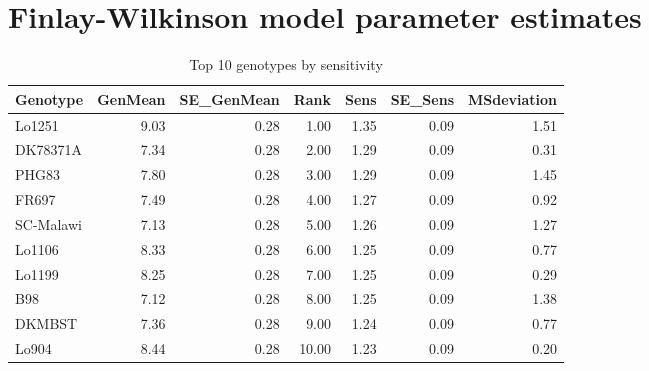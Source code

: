 \documentclass[a4paper,11pt]{article}\usepackage[]{graphicx}\usepackage[]{xcolor}
\makeatletter
\newenvironment{kframe}{%
 \def\at@end@of@kframe{}%
 \ifinner\ifhmode%
  \def\at@end@of@kframe{\end{minipage}}%
  \begin{minipage}{\columnwidth}%
 \fi\fi%
 \def\FrameCommand##1{\hskip\@totalleftmargin \hskip-\fboxsep
 \colorbox{shadecolor}{##1}\hskip-\fboxsep
     \hskip-\linewidth \hskip-\@totalleftmargin \hskip\columnwidth}%
 \MakeFramed {\advance\hsize-\width
   \@totalleftmargin\z@ \linewidth\hsize
   \@setminipage}}%
 {\par\unskip\endMakeFramed%
 \at@end@of@kframe}
\makeatother
\begin{document}
\section{Finlay-Wilkinson model parameter estimates}

\begin{kframe}


{\ttfamily\noindent\bfseries\color{errorcolor}{\#\# Error in order(estimates[[sortBy]], decreasing = TRUE): argument 1 is not a vector}}\end{kframe}%
\begin{table}[ht]
\begin{flushleft}
\caption{Top 10 genotypes by sensitivity} 
\label{topEstimates}
\begin{tabular}{lrrrrrr}
  \hline
Genotype & GenMean & SE\_GenMean & Rank & Sens & SE\_Sens & MSdeviation \\ 
  \hline
Lo1251 & 9.03 & 0.28 & 1.00 & 1.35 & 0.09 & 1.51 \\ 
  DK78371A & 7.34 & 0.28 & 2.00 & 1.29 & 0.09 & 0.31 \\ 
  PHG83 & 7.80 & 0.28 & 3.00 & 1.29 & 0.09 & 1.45 \\ 
  FR697 & 7.49 & 0.28 & 4.00 & 1.27 & 0.09 & 0.92 \\ 
  SC-Malawi & 7.13 & 0.28 & 5.00 & 1.26 & 0.09 & 1.27 \\ 
  Lo1106 & 8.33 & 0.28 & 6.00 & 1.25 & 0.09 & 0.77 \\ 
  Lo1199 & 8.25 & 0.28 & 7.00 & 1.25 & 0.09 & 0.29 \\ 
  B98 & 7.12 & 0.28 & 8.00 & 1.25 & 0.09 & 1.38 \\ 
  DKMBST & 7.36 & 0.28 & 9.00 & 1.24 & 0.09 & 0.77 \\ 
  Lo904 & 8.44 & 0.28 & 10.00 & 1.23 & 0.09 & 0.20 \\ 
   \hline
\end{tabular}
\end{flushleft}
\end{table}
\end{document}
